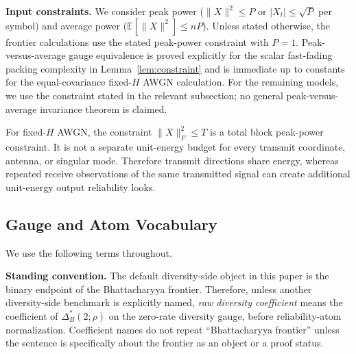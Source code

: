 \documentclass[lettersize,onecolumn]{IEEEtran}
\newcommand{\E}{\mathbb{E}}
\newcommand{\snr}{\rho}
\begin{document}
\textbf{Input constraints.}
We consider peak power ($\|X\|^2 \le P$ or $|X_t| \le \sqrt{P}$
per symbol) and average power ($\E[\|X\|^2] \le nP$). Unless stated
otherwise, the frontier calculations use the stated peak-power
constraint with $P = 1$. Peak-versus-average gauge equivalence is
proved explicitly for the scalar fast-fading packing complexity in
Lemma~\ref{lem:constraint} and is immediate up to constants for the
equal-covariance fixed-$H$ AWGN calculation. For the remaining
models, we use the constraint stated in the relevant subsection; no
general peak-versus-average invariance theorem is claimed.

For fixed-$H$ AWGN, the constraint $\|X\|_F^2\le T$ is a total block
peak-power constraint. It is not a separate unit-energy budget for
every transmit coordinate, antenna, or singular mode. Therefore
transmit directions share energy, whereas repeated receive
observations of the same transmitted signal can create additional
unit-energy output reliability looks.

\subsection{Gauge and Atom Vocabulary}\label{subsec:vocab}

We use the following terms throughout.

\textbf{Standing convention.} The default diversity-side object in
this paper is the binary endpoint of the Bhattacharyya frontier.
Therefore, unless another diversity-side benchmark is explicitly
named, \emph{raw diversity coefficient} means the coefficient of
$\Delta_B^*(2;\snr)$ on the zero-rate diversity gauge, before
reliability-atom normalization. Coefficient names do not repeat
``Bhattacharyya frontier'' unless the sentence is specifically about
the frontier as an object or a proof status.
\end{document}
